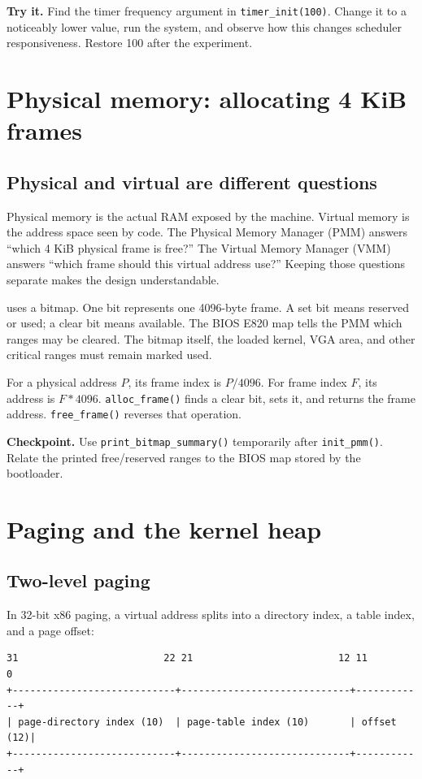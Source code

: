 \documentclass[11pt,oneside]{book}
\newcommand{\pathname}[1]{\texttt{\detokenize{#1}}}
\newcommand{\checkpoint}[1]{\medskip\noindent\textbf{Checkpoint.} #1\medskip}
\newcommand{\exercise}[1]{\medskip\noindent\textbf{Try it.} #1\medskip}
\begin{document}
\exercise{Find the timer frequency argument in \texttt{timer\_init(100)}. Change it to a noticeably lower value, run the system, and observe how this changes scheduler responsiveness. Restore 100 after the experiment.}

\chapter{Physical memory: allocating 4 KiB frames}
\section{Physical and virtual are different questions}
Physical memory is the actual RAM exposed by the machine. Virtual memory is the address space seen by code. The Physical Memory Manager (PMM) answers ``which 4 KiB physical frame is free?'' The Virtual Memory Manager (VMM) answers ``which frame should this virtual address use?'' Keeping those questions separate makes the design understandable.

\pathname{memory/pmm.c} uses a bitmap. One bit represents one 4096-byte frame. A set bit means reserved or used; a clear bit means available. The BIOS E820 map tells the PMM which ranges may be cleared. The bitmap itself, the loaded kernel, VGA area, and other critical ranges must remain marked used.

For a physical address \(P\), its frame index is \(P / 4096\). For frame index \(F\), its address is \(F * 4096\). \texttt{alloc\_frame()} finds a clear bit, sets it, and returns the frame address. \texttt{free\_frame()} reverses that operation.

\checkpoint{Use \texttt{print\_bitmap\_summary()} temporarily after \texttt{init\_pmm()}. Relate the printed free/reserved ranges to the BIOS map stored by the bootloader.}

\chapter{Paging and the kernel heap}
\section{Two-level paging}
In 32-bit x86 paging, a virtual address splits into a directory index, a table index, and a page offset:

\begin{verbatim}
31                         22 21                         12 11        0
+----------------------------+-----------------------------+------------+
| page-directory index (10)  | page-table index (10)       | offset (12)|
+----------------------------+-----------------------------+------------+
\end{verbatim}
\end{document}
